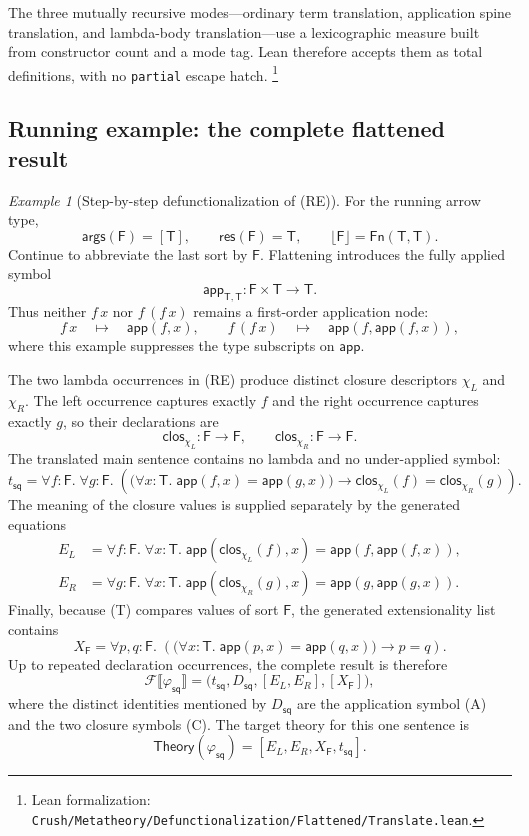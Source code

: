 \documentclass[11pt]{article}
\theoremstyle{remark}
\newtheorem{example}[definition]{Example}
\newcommand{\leanfile}[1]{\footnote{Lean formalization: \texttt{Crush/Metatheory/#1}.}}
\newcommand{\Fn}{\mathsf{Fn}}
\newcommand{\clos}{\mathsf{clos}}
\newcommand{\app}{\mathsf{app}}
\newcommand{\erase}[1]{\lfloor #1\rfloor}
\newcommand{\flattr}[1]{\mathcal F\llbracket #1\rrbracket}
\newcommand{\Theory}{\mathsf{Theory}}
\newcommand{\args}{\mathsf{args}}
\newcommand{\res}{\mathsf{res}}
\newcommand{\TreeTy}{\mathsf{T}}
\newcommand{\TreeFun}{\mathsf{F}}
\begin{document}
The three mutually recursive modes---ordinary term translation, application
spine translation, and lambda-body translation---use a lexicographic measure
built from constructor count and a mode tag. Lean therefore accepts them as
total definitions, with no \texttt{partial} escape hatch.
\leanfile{Defunctionalization/Flattened/Translate.lean}

\subsection{Running example: the complete flattened result}
\label{sec:running-flattened}

\begin{example}[Step-by-step defunctionalization of (RE)]
For the running arrow type,
\[
 \args(\TreeFun)=[\TreeTy],
 \qquad
 \res(\TreeFun)=\TreeTy,
 \qquad
 \erase{\TreeFun}=\Fn(\TreeTy,\TreeTy).
\]
Continue to abbreviate the last sort by $\TreeFun$. Flattening introduces the
fully applied symbol
\[
 \app_{\TreeTy,\TreeTy}:\TreeFun\times\TreeTy\longrightarrow\TreeTy.
\tag{A}
\]
Thus neither $f\,x$ nor $f\,(f\,x)$ remains a first-order application node:
\[
 f\,x\quad\mapsto\quad\app(f,x),
 \qquad
 f\,(f\,x)\quad\mapsto\quad\app(f,\app(f,x)),
\]
where this example suppresses the type subscripts on $\app$.

The two lambda occurrences in (RE) produce distinct closure descriptors
$\chi_L$ and $\chi_R$. The left occurrence captures exactly $f$ and the right
occurrence captures exactly $g$, so their declarations are
\[
 \clos_{\chi_L}:\TreeFun\longrightarrow\TreeFun,
 \qquad
 \clos_{\chi_R}:\TreeFun\longrightarrow\TreeFun.
\tag{C}
\]
The translated main sentence contains no lambda and no under-applied symbol:
\[
 t_{\mathsf{sq}}=
 \forall f{:}\TreeFun.\;\forall g{:}\TreeFun.\;
 \left(
  \bigl(\forall x{:}\TreeTy.\;\app(f,x)=\app(g,x)\bigr)
  \to
  \clos_{\chi_L}(f)=\clos_{\chi_R}(g)
 \right).
\tag{T}
\]
The meaning of the closure values is supplied separately by the generated
equations
\[
\begin{aligned}
 E_L&=\forall f{:}\TreeFun.\;\forall x{:}\TreeTy.\;
   \app(\clos_{\chi_L}(f),x)=\app(f,\app(f,x)),\\
 E_R&=\forall g{:}\TreeFun.\;\forall x{:}\TreeTy.\;
   \app(\clos_{\chi_R}(g),x)=\app(g,\app(g,x)).
\end{aligned}
\tag{E}
\]
Finally, because (T) compares values of sort $\TreeFun$, the generated
extensionality list contains
\[
 X_{\TreeFun}=\forall p,q{:}\TreeFun.\;
 \left(
   \bigl(\forall x{:}\TreeTy.\;\app(p,x)=\app(q,x)\bigr)
   \to p=q
 \right).
\tag{X}
\]
Up to repeated declaration occurrences, the complete result is therefore
\[
 \flattr{\varphi_{\mathsf{sq}}}
 =\bigl(t_{\mathsf{sq}},
        D_{\mathsf{sq}},
        [E_L,E_R],
        [X_{\TreeFun}]\bigr),
\]
where the distinct identities mentioned by $D_{\mathsf{sq}}$ are the
application symbol (A) and the two closure symbols (C). The target theory for
this one sentence is
\[
 \Theory(\varphi_{\mathsf{sq}})
   =[E_L,E_R,X_{\TreeFun},t_{\mathsf{sq}}].
\tag{R}
\]
\end{example}
\end{document}
